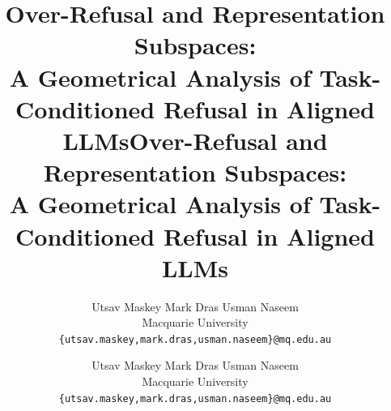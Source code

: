 \documentclass[11pt]{article}
\title{Over-Refusal and Representation Subspaces:\\
A Geometrical Analysis of Task-Conditioned Refusal in Aligned LLMs}
\author{
  Utsav Maskey \quad
  Mark Dras \quad
  Usman Naseem \\
  Macquarie University \\
  \texttt{\{utsav.maskey,mark.dras,usman.naseem\}@mq.edu.au}
}
\newcommand{\ph}[1]{\textcolor{gray}{[#1]}}        %
\newcommand{\todo}[1]{\textcolor{red}{\textbf{[TODO: #1]}}}
\newcommand{\OR}{\textsc{or}}                        %
\begin{document}
\usepackage[review]{acl}
\usepackage{times}
\usepackage{latexsym}
\usepackage[T1]{fontenc}
\usepackage[utf8]{inputenc}
\usepackage{microtype}
\usepackage{inconsolata}
\usepackage{graphicx}
\usepackage{amsmath}
\usepackage{amssymb}
\usepackage{booktabs}
\usepackage{subcaption}
\usepackage{xcolor}
\usepackage{multirow}
\usepackage{placeins}

\newcommand{\ph}[1]{\textcolor{gray}{[#1]}}        %
\newcommand{\todo}[1]{\textcolor{red}{\textbf{[TODO: #1]}}}
\newcommand{\OR}{\textsc{or}}                        %


\title{Over-Refusal and Representation Subspaces:\\
A Geometrical Analysis of Task-Conditioned Refusal in Aligned LLMs}

\author{
  Utsav Maskey \quad
  Mark Dras \quad
  Usman Naseem \\
  Macquarie University \\
  \texttt{\{utsav.maskey,mark.dras,usman.naseem\}@mq.edu.au}
}
\end{document}
